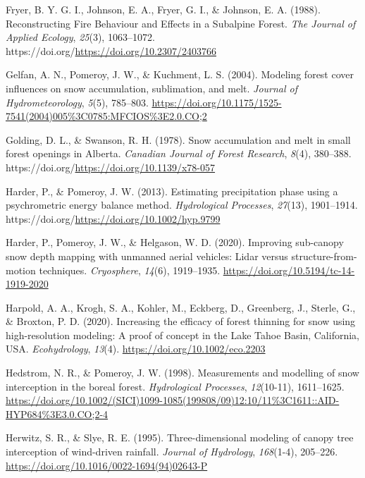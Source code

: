 \documentclass[
  letterpaper,
  DIV=11,
  numbers=noendperiod]{scrartcl}
\newlength{\cslhangindent}
\newenvironment{CSLReferences}[2] %
 {\begin{list}{}{%
  \setlength{\itemindent}{0pt}
  \setlength{\leftmargin}{0pt}
  \setlength{\parsep}{0pt}
  \ifodd #1
   \setlength{\leftmargin}{\cslhangindent}
   \setlength{\itemindent}{-1\cslhangindent}
  \fi
  \setlength{\itemsep}{#2\baselineskip}}}
 {\end{list}}
\begin{document}
\begin{CSLReferences}{1}{0}
Fryer, B. Y. G. I., Johnson, E. A., Fryer, G. I., \& Johnson, E. A.
(1988). {Reconstructing Fire Behaviour and Effects in a Subalpine
Forest}. \emph{The Journal of Applied Ecology}, \emph{25}(3),
1063--1072. https://doi.org/\url{https://doi.org/10.2307/2403766}

Gelfan, A. N., Pomeroy, J. W., \& Kuchment, L. S. (2004). {Modeling
forest cover influences on snow accumulation, sublimation, and melt}.
\emph{Journal of Hydrometeorology}, \emph{5}(5), 785--803.
\url{https://doi.org/10.1175/1525-7541(2004)005\%3C0785:MFCIOS\%3E2.0.CO;2}

Golding, D. L., \& Swanson, R. H. (1978). {Snow accumulation and melt in
small forest openings in Alberta}. \emph{Canadian Journal of Forest
Research}, \emph{8}(4), 380--388.
https://doi.org/\url{https://doi.org/10.1139/x78-057}

Harder, P., \& Pomeroy, J. W. (2013). {Estimating precipitation phase
using a psychrometric energy balance method}. \emph{Hydrological
Processes}, \emph{27}(13), 1901--1914.
https://doi.org/\url{https://doi.org/10.1002/hyp.9799}

Harder, P., Pomeroy, J. W., \& Helgason, W. D. (2020). {Improving
sub-canopy snow depth mapping with unmanned aerial vehicles: Lidar
versus structure-from-motion techniques}. \emph{Cryosphere},
\emph{14}(6), 1919--1935. \url{https://doi.org/10.5194/tc-14-1919-2020}

Harpold, A. A., Krogh, S. A., Kohler, M., Eckberg, D., Greenberg, J.,
Sterle, G., \& Broxton, P. D. (2020). {Increasing the efficacy of forest
thinning for snow using high-resolution modeling: A proof of concept in
the Lake Tahoe Basin, California, USA}. \emph{Ecohydrology},
\emph{13}(4). \url{https://doi.org/10.1002/eco.2203}

Hedstrom, N. R., \& Pomeroy, J. W. (1998). {Measurements and modelling
of snow interception in the boreal forest}. \emph{Hydrological
Processes}, \emph{12}(10-11), 1611--1625.
\url{https://doi.org/10.1002/(SICI)1099-1085(199808/09)12:10/11\%3C1611::AID-HYP684\%3E3.0.CO;2-4}

Herwitz, S. R., \& Slye, R. E. (1995). {Three-dimensional modeling of
canopy tree interception of wind-driven rainfall}. \emph{Journal of
Hydrology}, \emph{168}(1-4), 205--226.
\url{https://doi.org/10.1016/0022-1694(94)02643-P}


\end{CSLReferences}
\end{document}
